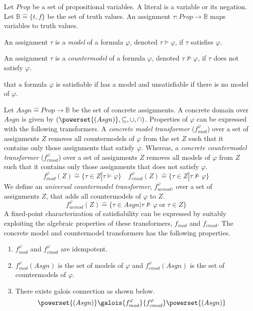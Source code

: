 Let $Prop$ be a set of propositional variables.  A literal is a variable or its
negation.  Let $\mathbb{B} \mathrel{\hat=} \{t,f\}$ be the set of truth values. 
An assignment $\tau: Prop \rightarrow \mathbb{B}$ maps variables to truth
values. 
%
\begin{definition}
  An assignment $\tau$ is a \emph{model} of a formula $\varphi$, denoted $\tau
  \models \varphi$, if $\tau$ satisfies $\varphi$.
\end{definition}
%
\begin{definition}
  An assignment $\tau$ is a \emph{countermodel} of a formula $\varphi$, denoted $\tau
  \not\models \varphi$, if $\tau$ does not satisfy $\varphi$.
\end{definition}

 that a formula $\varphi$ is satisfiable if has a model and
unsatisfiable if there is no model of $\varphi$. 

Let $Asgn \mathrel{\hat=} Prop \rightarrow \mathbb{B}$ be the set of
concrete assignments.  A concrete domain over $Asgn$ is given by
$(\powerset{(Asgn)},\subseteq,\cup,\cap)$. Properties of $\varphi$ can be
expressed with the following transformers. A \emph{concrete model transformer} 
($f_{mod}^\varphi$) over a set of assignments $Z$ removes all countermodels of 
$\varphi$ from the set $Z$ such that it contains only those assignments that
satisfy $\varphi$.  Whereas, a \emph{concrete countermodel transformer} ($f_{cmod}^\varphi$) 
over a set of assignments $Z$ removes all models of $\varphi$ from $Z$ such that
it contains only those assignments that does not satisfy $\varphi$.
\[ f_{mod}^\varphi(Z) \mathrel{\hat=} \{\tau \in Z | \tau \models \varphi \}
\quad  
f_{cmod}^\varphi(Z) \mathrel{\hat=} \{\tau \in Z | \tau \not\models \varphi \}
\]
We define an \emph{universal countermodel transformer}, $f_{ucmod}^\varphi$, 
over a set of assignments $Z$, that adds all countermodels of $\varphi$ to 
$Z$. 
\[
f_{ucmod}^\varphi(Z) \mathrel{\hat=} \{\tau \in Asgn | \tau \not\models 
\varphi\; \text{or}\; \tau \in Z\}
\]
%
A fixed-point characterization of satisfiability can be expressed by suitably
exploiting the algebraic properties of these transformers, $f_{mod}$ and
$f_{cmod}$.  The concrete model and countermodel transformers has the following 
properties. 
\begin{enumerate}
  \item $f_{mod}^\varphi$ and $f_{cmod}^\varphi$ are idempotent.   
  \item $f_{mod}^\varphi(Asgn)$ is the set of models of $\varphi$ 
    and $f_{cmod}^\varphi(Asgn)$ is the set of countermodels of $\varphi$.
  \item There exists galois connection as shown below.
    \[ \powerset{(Asgn)} \galois{f_{mod}^\varphi}{f_{cmod}^\varphi}
    \powerset{(Asgn)} \]
\end{enumerate}

